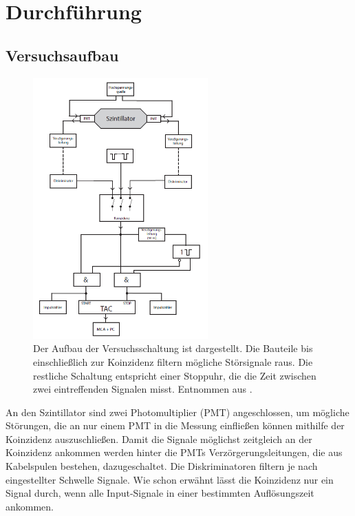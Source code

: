 \newpage
\section{Durchführung}
    \subsection{Versuchsaufbau}
        \begin{figure}[h]
          \centering
          \includegraphics[width = 0.6\textwidth]{pictures/Aufbau.png}
          \caption{Der Aufbau der Versuchsschaltung ist dargestellt. Die Bauteile bis einschließlich zur Koinzidenz filtern mögliche Störsignale raus. Die restliche Schaltung entspricht einer Stoppuhr, die die Zeit zwischen zwei eintreffenden Signalen misst. Entnommen aus \cite{tu_dortmund_versuchsanleitung_2021-1}.}
          \label{fig:Aufbau}
        \end{figure}

        \FloatBarrier

        An den Szintillator sind zwei Photomultiplier (PMT) angeschlossen, um mögliche Störungen, die an nur einem PMT in die Messung einfließen können mithilfe der Koinzidenz auszuschließen.
        Damit die Signale möglichst zeitgleich an der Koinzidenz ankommen werden hinter die PMTs Verzörgerungsleitungen, die aus Kabelspulen bestehen, dazugeschaltet.
        Die Diskriminatoren filtern je nach eingestellter Schwelle Signale.
        Wie schon erwähnt lässt die Koinzidenz nur ein Signal durch, wenn alle Input-Signale in einer bestimmten Auflösungszeit ankommen.

